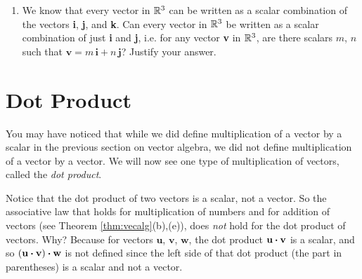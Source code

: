 \begin{enumerate}[\bfseries 1.]
[{[\bfseries 1.]}]
 \item We know that every vector in $\mathbb{R}^{3}$ can be written as a scalar combination of the vectors \textbf{i},
 \textbf{j}, and \textbf{k}. Can every vector in $\mathbb{R}^{3}$ be written as a scalar combination of just \textbf{i} and
 \textbf{j}, i.e. for any vector \textbf{v} in $\mathbb{R}^{3}$, are there scalars $m$, $n$ such that $\textbf{v} =
 m\,\textbf{i} + n\,\textbf{j}$? Justify your answer.
\end{enumerate}


\newpage
\section{Dot Product}
You may have noticed that while we did define multiplication of a vector by a scalar in the previous section on
vector algebra, we did not define multiplication of a vector by a vector. We will now see one type of
multiplication of vectors, called the \emph{dot product}.


Notice that the dot product of two vectors is a scalar, not a vector. 
So the associative law that holds for multiplication of numbers and for addition of vectors (see
Theorem \ref{thm:vecalg}(b),(e)), does \emph{not} hold for the dot product of vectors. Why? Because for vectors
$\textbf{u}$, $\textbf{v}$, $\textbf{w}$, the dot product $\textbf{u} \bm{\cdot} \textbf{v}$ is a scalar, and so
$(\textbf{u} \bm{\cdot} \textbf{v}) \bm{\cdot} \textbf{w}$ is not defined since the left side of that dot product
(the part in parentheses) is a scalar and not a vector.

